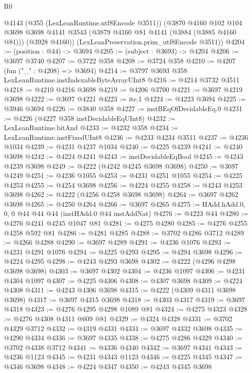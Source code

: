 \begin{lexlean}{R0}
\begin{coremodule}
      @4143
      (@355 (LexLeanRuntime.utf8Encode @3511))
      (@3870
        @4160
        @102
        @104
        @3698
        @3698
        @4141
        @3543
        (@3879 @4160 @81 @4141 (@3884 (@3885 @4160 @81)))
        (@3928 @4160))
      (LexLeanPreservation.prim_utf8Encode @3511))
@4204 := (position : @44) -> @3694
@4205 := (subject : @3693) -> @4204
@4206 := @3697 @3740
@4207 := @3722 @358
@4208 := @3724 @358
@4210 := @4207 (fun ("_" : @4208) => @3694)
@4214 := @3797 @3693 @358 LexLeanRuntime.instIndexableByteArrayUInt8
@4216 := @4214 @3732 @3511
@4218 := @4210 @4216 @3698
@4219 := @4206 @3700
@4221 := @3697 @4219 @3698
@4222 := @3697 @4221
@4223 := ite.{1}
@4224 := @4223 @3694
@4225 := @3946 @3694
@4226 := @3840 @358
@4227 := instBEqOfDecidableEq.{0}
@4231 := @4226 (@4227 @358 instDecidableEqUInt8)
@4232 := LexLeanRuntime.bitAnd
@4233 := @4232 @358
@4234 := LexLeanRuntime.instFixedUInt8
@4236 := @4233 @4234 @3511
@4237 := @4236 @1034
@4239 := @4231 @4237 @1034
@4240 := @4225 @4239
@4241 := @4240 @3698
@4242 := @4224 @4241
@4243 := instDecidableEqBool
@4245 := @4243 @4239 @3698
@4249 := @4222 (@4242 @4245 @3698 @3698)
@4250 := @3697 @4249
@4251 := @4236 @1055
@4253 := @4231 @4251 @1055
@4254 := @4225 @4253
@4255 := @4254 @3698
@4256 := @4224 @4255
@4258 := @4243 @4253 @3698
@4262 := @4222 (@4256 @4258 @3698 @3698)
@4264 := @3697 @4262 @3698
@4265 := @4250 @4264
@4266 := @3697 @4265
@4275 := HAdd.hAdd.{0, 0, 0} @44 @44 @44 (instHAdd.{0} @44 instAddNat)
@4276 := @4223 @44
@4280 := @4276 @4241 @4245 @1047 @81
@4281 := @4275 @4280
@4285 := @4276 @4255 @4258 @592 @81
@4286 := @4281 @4285
@4288 := @3702 @4286 @3712
@4289 := @4266 @4288
@4290 := @3697 @4289
@4291 := @4236 @1076
@4293 := @4231 @4291 @1076
@4294 := @4225 @4293
@4295 := @4294 @3698
@4296 := @4224 @4295
@4298 := @4243 @4293 @3698
@4302 := @4222 (@4296 @4298 @3698 @3698)
@4303 := @3697 @4302
@4304 := @4236 @1097
@4306 := @4231 @4304 @1097
@4307 := @4225 @4306
@4308 := @4307 @3698
@4309 := @4224 @4308
@4311 := @4243 @4306 @3698
@4315 := @4222 (@4309 @4311 @3698 @3698)
@4317 := @3697 @4315 @3698
@4318 := @4303 @4317
@4319 := @3697 @4318
@4323 := @4276 @4295 @4298 @1089 @81
@4324 := @4275 @4323
@4328 := @4276 @4308 @4311 @609 @81
@4329 := @4324 @4328
@4331 := @3702 @4329 @3712
@4332 := @4319 @4331
@4334 := @3697 @4332 @3698
@4335 := @4290 @4334
@4336 := @3697 @4335
@4338 := @4275 @4286 @4329
@4340 := @3702 @4338 @3712
@4341 := @4336 @4340
@4342 := @3697 @4341
@4343 := @4236 @1123
@4345 := @4231 @4343 @1123
@4346 := @4225 @4345
@4347 := @4346 @3698
@4348 := @4224 @4347
@4350 := @4243 @4345 @3698

\end{coremodule}
\end{lexlean}
